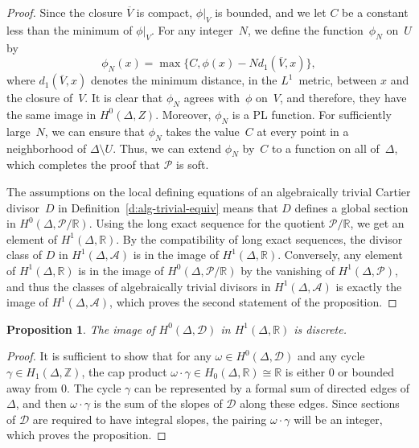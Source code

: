\documentclass[11pt,reqno]{amsart}
\newtheorem{prop}[thm]{Proposition}
\theoremstyle{definition}
\newcommand{\cA}{\mathcal A}
\newcommand{\cD}{\mathcal D}
\newcommand{\cP}{\mathcal P}
\newcommand{\isom}{\cong}
\newcommand{\RR}{\mathbb R}
\newcommand{\ZZ}{\mathbb Z}
\begin{document}
\begin{proof}
Since the closure $\overline V$ is compact, $\phi\vert_V$ is bounded, and we let $C$
be a constant less than the minimum of $\phi \vert_V$.
For any integer~$N$, we define the
function~$\phi_N$ on~$U$ by
\begin{equation*}
\phi_N(x) = \max\{C, \phi(x) - N d_1(\overline V, x)\},
\end{equation*}
where $d_1(\overline V,x)$ denotes the minimum distance, in the $L^1$~metric,
between $x$ and the closure of~$V$. It is clear that $\phi_N$ agrees with~$\phi$
on~$V$, and therefore, they have the same image in $H^0(\Delta, Z)$. Moreover,
$\phi_N$ is a PL function. For sufficiently large~$N$, we can ensure that
$\phi_N$ takes the value~$C$ at every point in a neighborhood of $\Delta
\setminus U$. Thus, we can extend $\phi_N$ by~$C$ to a function on all
of~$\Delta$, which completes the proof that $\cP$ is soft.

The assumptions on the local defining equations of an algebraically trivial
Cartier divisor~$D$ in Definition~\ref{d:alg-trivial-equiv} means that $D$
defines a global section in $H^0(\Delta, \cP/\RR)$. Using the long exact
sequence for the quotient $\cP/ \RR$, we get an element of $H^1(\Delta, \RR)$.
By the compatibility of long exact sequences, the divisor class of $D$ in
$H^1(\Delta, \cA)$ is in the image of $H^1(\Delta, \RR)$. Conversely, any
element of $H^1(\Delta, \RR)$ is in the image of $H^0(\Delta, \cP/\RR)$ by the
vanishing of $H^1(\Delta, \cP)$, and thus the classes of algebraically trivial
divisors in $H^1(\Delta, \cA)$ is exactly the image of $H^1(\Delta, \cA)$, which
proves the second statement of the proposition.
\end{proof}

\begin{prop}\label{p:differentials-discrete}
The image of $H^0(\Delta, \cD)$ in $H^1(\Delta, \RR)$ is discrete.
\end{prop}

\begin{proof}
It is sufficient to show that for any $\omega \in H^0(\Delta, \cD)$ and any
cycle $\gamma \in H_1(\Delta, \ZZ)$, the cap product $\omega \cdot \gamma \in
H_0(\Delta, \RR) \isom \RR$ is either $0$ or bounded away from $0$. The cycle
$\gamma$ can be represented by a formal sum of directed edges of $\Delta$, and
then $\omega \cdot \gamma$ is the sum of the slopes of $\cD$ along these edges.
Since sections of $\cD$ are required to have integral slopes, the pairing
$\omega \cdot \gamma$ will be an integer, which proves the proposition.
\end{proof}
\end{document}
